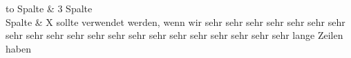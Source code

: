 \begin{table}[h]
	\centering
	\begin{tabu} to \linewidth {l X}
		 Spalte  & 3 Spalte \\
		 Spalte & X sollte verwendet werden, wenn wir sehr sehr sehr sehr sehr sehr sehr sehr sehr sehr sehr sehr sehr sehr sehr sehr sehr sehr sehr sehr sehr lange Zeilen haben \\
		\bottomrule 
	\end{tabu} 
	\caption{Tabelle mit Autmatischen Umbrüchen.}
\end{table}



